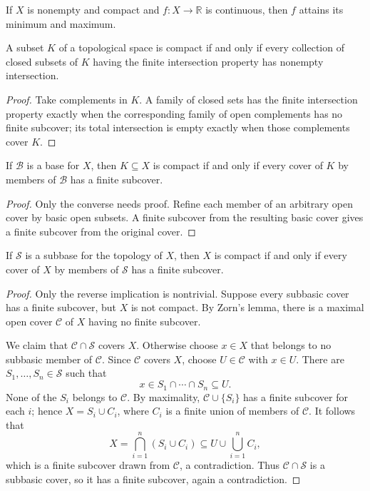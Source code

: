 \begin{cor}
If $X$ is nonempty and compact and $f:X\to\mathbb{R}$ is continuous,
then $f$ attains its minimum and maximum.
\end{cor}

\begin{thm}
A subset $K$ of a topological space is compact if and only if every collection
of closed subsets of $K$ having the finite intersection property has
nonempty intersection.
\end{thm}

\begin{proof}
Take complements in $K$. A family of closed sets has the finite intersection
property exactly when the corresponding family of open complements has no
finite subcover; its total intersection is empty exactly when those
complements cover $K$.
\end{proof}

\begin{thm}
If $\mathcal{B}$ is a base for $X$, then $K\subseteq X$ is compact if and only
if every cover of $K$ by members of $\mathcal{B}$ has a finite subcover.
\end{thm}

\begin{proof}
Only the converse needs proof. Refine each member of an arbitrary open cover
by basic open subsets. A finite subcover from the resulting basic cover gives
a finite subcover from the original cover.
\end{proof}

\begin{thm}
If $\mathcal{S}$ is a subbase for the topology of $X$, then $X$ is compact if
and only if every cover of $X$ by members of $\mathcal{S}$ has a finite
subcover.
\end{thm}

\begin{proof}
Only the reverse implication is nontrivial. Suppose every subbasic cover has
a finite subcover, but $X$ is not compact. By Zorn's lemma, there is a maximal
open cover $\mathcal{C}$ of $X$ having no finite subcover.

We claim that $\mathcal{C}\cap\mathcal{S}$ covers $X$. Otherwise choose
$x\in X$ that belongs to no subbasic member of $\mathcal{C}$. Since
$\mathcal{C}$ covers $X$, choose $U\in\mathcal{C}$ with $x\in U$. There are
$S_1,\ldots,S_n\in\mathcal{S}$ such that
\[
x\in S_1\cap\cdots\cap S_n\subseteq U.
\]
None of the $S_i$ belongs to $\mathcal{C}$. By maximality,
$\mathcal{C}\cup\{S_i\}$ has a finite subcover for each $i$; hence
$X=S_i\cup C_i$, where $C_i$ is a finite union of members of $\mathcal{C}$.
It follows that
\[
X=\bigcap_{i=1}^n(S_i\cup C_i)
\subseteq U\cup\bigcup_{i=1}^nC_i,
\]
which is a finite subcover drawn from $\mathcal{C}$, a contradiction. Thus
$\mathcal{C}\cap\mathcal{S}$ is a subbasic cover, so it has a finite
subcover, again a contradiction.
\end{proof}

